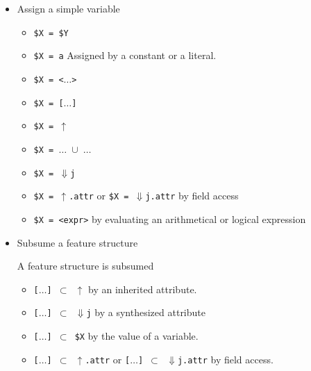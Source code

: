 \documentclass[11pt]{article}
\begin{document}
\begin{itemize}
\begin{itemize}
		            \begin{itemize}
			            \item $\Uparrow$\verb# = $X#
			            \item $\Uparrow$\verb# = [#$\dots$\verb#]#
			            \item $\Uparrow$\verb# = #$\uparrow$
			            \item $\Uparrow$\verb# = #$\dots$\verb# #$\cup$\verb# #$\dots$
			            \item $\Uparrow$\verb# = #$\Downarrow$\verb#j#
			            \item $\Uparrow$\verb# = #$\uparrow$\verb#.attr# or
			                  $\Uparrow$\verb# = #$\Downarrow$\verb#j.attr#
		            \end{itemize}

		      \item  Assign a simple variable

		            \begin{itemize}
			            \item \verb#$X = $Y#
			            \item \verb#$X = a# Assigned by a constant or a literal.
			            \item \verb#$X = <#$\dots$\verb#>#
			            \item \verb#$X = [#$\dots$\verb#]#
			            \item \verb#$X = #$\uparrow$
			            \item \verb#$X = #$\dots$\verb# #$\cup$\verb# #$\dots$
			            \item \verb#$X = #$\Downarrow$\verb#j#
			            \item \verb#$X = #$\uparrow$\verb#.attr# or
			                  \verb#$X = #$\Downarrow$\verb#j.attr# by field access
			            \item \verb#$X = <expr>#  by evaluating an arithmetical or logical expression
		            \end{itemize}

		      \item Subsume a feature structure

		            A feature structure is subsumed

		            \begin{itemize}
			            \item \verb#[#$\dots$\verb#] #$\subset$\verb# #$\uparrow$ by an inherited attribute.
			            \item \verb#[#$\dots$\verb#] #$\subset$\verb# #$\Downarrow$\verb#j# by a synthesized attribute
			            \item \verb#[#$\dots$\verb#] #$\subset$\verb# $X# by the value of a variable.
			            \item \verb#[#$\dots$\verb#] #$\subset$\verb# #$\uparrow$\verb#.attr# or
			                  \verb#[#$\dots$\verb#] #$\subset$\verb# #$\Downarrow$\verb#j.attr# by field access.
		            \end{itemize}


\end{itemize}
\end{itemize}
\end{document}
